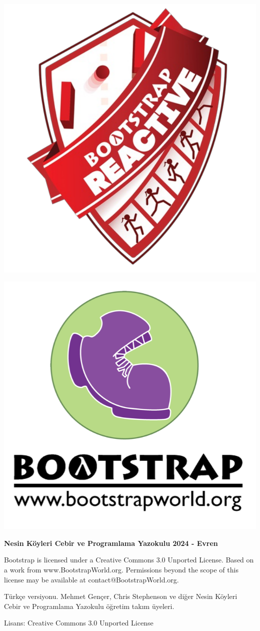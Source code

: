 \documentclass[12pt, a4paper]{article}
\begin{document}
\vspace*{0.8cm}
\begin{center}
\includegraphics[width=0.8\linewidth]{reactive.png}

\includegraphics[width=0.25\linewidth]{bootstrap-logo.png}
 
\end{center}

\vspace*{0.2cm}


\begin{center}
{\Large \bf{Nesin Köyleri Cebir ve Programlama Yazokulu 2024 - Evren}}

{\tiny Bootstrap is licensed under a Creative Commons 3.0 Unported License. Based on a work from
www.BootstrapWorld.org. Permissions beyond the scope of this license may be available at
contact@BootstrapWorld.org.

Türkçe versiyonu. Mehmet Gençer, Chris Stephenson ve diğer Nesin Köyleri Cebir ve Programlama Yazokulu öğretim takım üyeleri.

Lisans: Creative Commons 3.0 Unported License} 
\end{center}
\end{document}
